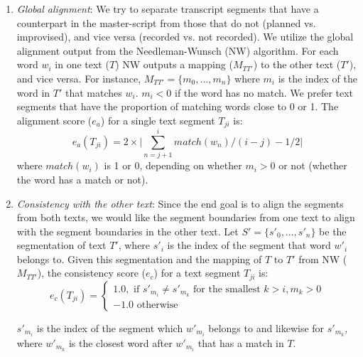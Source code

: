 \begin{enumerate}
\item{\textit{Global alignment}: We try to separate transcript segments that have a counterpart in the master-script from those that do not (planned vs. improvised), and vice versa (recorded vs. not recorded). We utilize the global alignment output from the Needleman-Wunsch (NW) algorithm. For each word $w_i$ in one text ($T$) NW outputs a mapping ($M_{TT'}$) 
to the other text ($T'$), and vice versa. For instance, $M_{TT'} = \{m_0, \dots,m_n\}$ where $m_i$ is the index of the word in  $T'$ that matches $w_i$. $m_i < 0$ if the word has no match. We prefer text segments that have the proportion of matching words close to 0 or 1. The alignment score ($e_a$) for a single text segment $T_{ji}$ is:  
\begin{equation}
e_{a}(T_{ji}) = 2\times\bigg|\sum_{n=j+1}^{i}{match(w_n)}\big/(i-j) - 1/2 \bigg|
\end{equation}
where $match(w_i)$ is 1 or 0, depending on whether $m_i > 0$ or not (whether the word has a match or not).
}
\item{\textit{Consistency with the other text}: Since the end goal is to align the segments from both texts, we would like the segment boundaries from one text to align with the segment boundaries in the other text. Let $S' = \{s'_0, \dots, s'_n\}$ be the segmentation of text $T'$, where $s'_i$ is the index of the segment that word $w'_i$ belongs to. Given this segmentation and the mapping of $T$ to $T'$ from NW  ($M_{TT'}$), the consistency score ($e_c$) for a text segment $T_{ji}$ is:
\begin{equation}
    e_c(T_{ji})= 
\begin{cases}
   1.0, \text{ if } s'_{m_i} \neq s'_{m_k} \text{ for the smallest } k>i, m_k >0\\
   -1.0 \text{ otherwise }
\end{cases}
\end{equation}

$s'_{m_i}$ is the index of the segment which $w'_{m_i}$ belongs to and likewise for $s'_{m_k}$, where $w'_{m_k}$ is the closest word after $w'_{m_i}$ that has a match in $T$.
} 


\end{enumerate}




